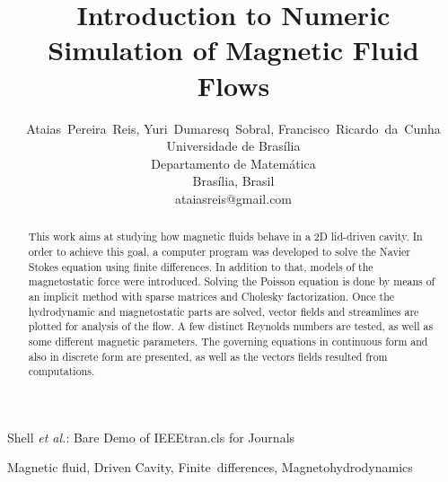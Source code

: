 \documentclass[journal]{IEEEtran}
\begin{document}
\title{Introduction to Numeric Simulation of Magnetic Fluid Flows}

\author{Ataias~Pereira~Reis, Yuri~Dumaresq~Sobral, Francisco~Ricardo~da~Cunha\\Universidade de Brasília\\Departamento de Matemática\\Brasília, Brasil\\ataiasreis@gmail.com}

%
{Shell \MakeLowercase{\textit{et al.}}: Bare Demo of IEEEtran.cls for Journals}

\maketitle


\begin{abstract}
This work aims at studying how magnetic fluids behave in a 2D lid-driven cavity. In order to achieve this goal, a computer program was developed to solve the Navier Stokes equation using finite differences. In addition to that, models of the magnetostatic force were introduced. Solving the Poisson equation is done by means of an implicit method with sparse matrices and Cholesky factorization. Once the hydrodynamic and magnetostatic parts are solved, vector fields and streamlines are plotted for analysis of the flow. A few distinct Reynolds numbers are tested, as well as some different magnetic parameters. The governing equations in continuous form and also in discrete form are presented, as well as the vectors fields resulted from computations.
\end{abstract}

\begin{IEEEkeywords}
Magnetic fluid, Driven Cavity, Finite~differences, Magnetohydrodynamics
\end{IEEEkeywords}

%
\IEEEpeerreviewmaketitle
\end{document}
